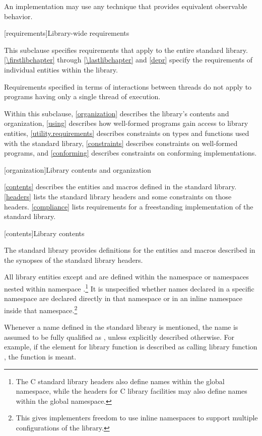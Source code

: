 \pnum
An implementation may use any technique that provides equivalent observable behavior.

[requirements]{Library-wide requirements}

\pnum
This subclause specifies requirements that apply to the entire \Cpp{} standard library.
\ref{\firstlibchapter} through \ref{\lastlibchapter} and \ref{depr}
specify the requirements of individual entities within the library.

\pnum
Requirements specified in terms of interactions between threads do not apply to
programs having only a single thread of execution.

\pnum
Within this subclause, \ref{organization} describes the library's contents and
organization, \ref{using} describes how well-formed \Cpp{} programs gain access to library
entities,
\ref{utility.requirements} describes constraints on types and functions used with
the \Cpp{} standard library,
\ref{constraints} describes constraints on well-formed \Cpp{} programs, and
\ref{conforming} describes constraints on conforming implementations.

[organization]{Library contents and organization}

\pnum
\ref{contents} describes the entities and macros defined in the \Cpp{} standard library.
\ref{headers} lists the standard library headers and some constraints on those headers.
\ref{compliance} lists requirements for a freestanding implementation of the \Cpp{}
standard library.

[contents]{Library contents}

\pnum
The \Cpp{} standard library provides definitions
for the entities and macros described in the synopses
of the \Cpp{} standard library headers.

\pnum
All library entities except
and
are defined within the namespace
or namespaces nested within namespace
.\footnote{The C standard library headers also define
names within the global namespace, while the \Cpp{} headers for C library
facilities may also define names within the global namespace.}%
It is unspecified whether names declared in a specific namespace are declared
directly in that namespace or in an inline namespace inside that
namespace.\footnote{This gives implementers freedom to use inline namespaces to
support multiple configurations of the library.}

\pnum
Whenever a name  defined in the standard library is mentioned,
the name  is assumed to be fully qualified as
,
unless explicitly described otherwise. For example, if the \effects element
for library function  is described as calling library function ,
the function
is meant.

